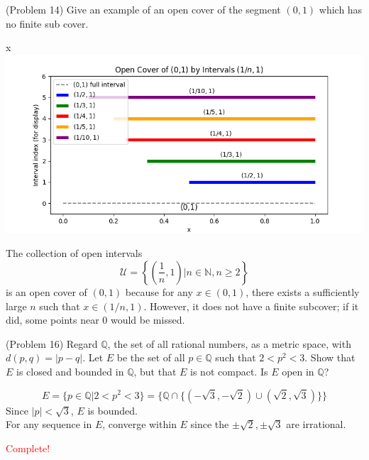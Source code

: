 \documentclass[12pt]{exam}
\begin{document}
\begin{questions}
\question[] (Problem 14) Give an example of an open cover of the segment \((0,1)\) which has no finite sub cover. 

\begin{solution}
x
    \includegraphics[scale=0.5]{figures/Figure_1.png}


    The collection of open intervals \[\mathcal{U} = \left\{\left(\dfrac{1}{n},1\right)|n \in \mathbb{N}, n \geq 2\right\}\]
is an open cover of \((0,1)\) because for any \(x \in (0,1)\), there exists a sufficiently large \(n\) such that \(x \in (1/n,1)\). However, it does not have a finite subcover; if it did, some points near 0 would be missed. 
\end{solution}

\question[] (Problem 16) Regard \(\mathbb{Q}\), the set of all rational numbers, as a metric space, with \(d(p,q)=|p-q|\). Let \(E\) be the set of all \(p\in \mathbb{Q}\) such that \(2<p^2<3\). Show that \(E\) is closed and bounded in \(\mathbb{Q}\), but that \(E\) is not compact. Is \(E\) open in \(\mathbb{Q}\)? 

\begin{solution}
    \[E = \{p \in \mathbb{Q}| 2 < p^2<3\} = \{\mathbb{Q} \cap \{(-\sqrt{3}, -\sqrt{2}) \cup (\sqrt{2}, \sqrt{3})\}\}\] 
    Since \(|p|< \sqrt{3}\), \(E\) is bounded. \\
For any sequence in \(E\), converge within \(E\) since the \(\pm \sqrt{2}, \pm \sqrt{3}\) are irrational. 

\textcolor{red}{Complete!}

\end{solution}







\end{questions}
\end{document}
